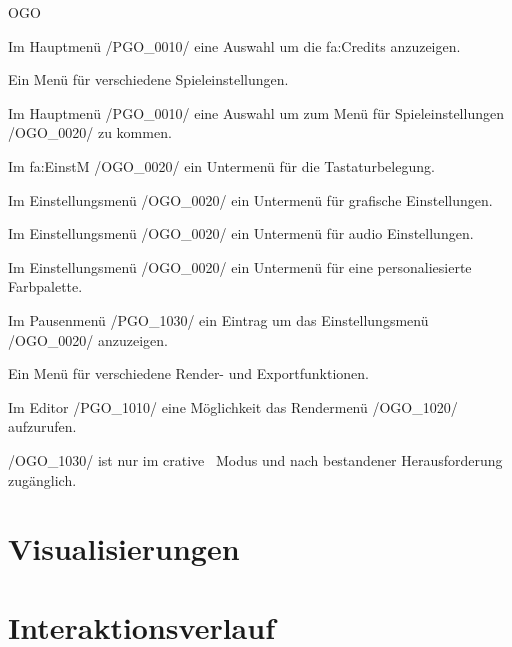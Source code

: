 \begin{ids}{\gls{OGO}}

	\id[0010] Im Hauptmenü /PGO\_0010/ eine Auswahl um die \gls{fa:Credits} anzuzeigen.
	
	\id[0020] Ein Menü für verschiedene Spieleinstellungen.
	
	\id[0030] Im Hauptmenü /PGO\_0010/ eine Auswahl um zum Menü für Spieleinstellungen /OGO\_0020/ zu kommen.
	
	\id[0040] Im \gls{fa:EinstM} /OGO\_0020/ ein Untermenü für die Tastaturbelegung.
	
	\id[0050] Im Einstellungsmenü /OGO\_0020/ ein Untermenü für grafische Einstellungen.
	
	\id[0060] Im Einstellungsmenü /OGO\_0020/ ein Untermenü für audio Einstellungen.
	
	\id[0070] Im Einstellungsmenü /OGO\_0020/ ein Untermenü für eine personaliesierte Farbpalette.
	
	\id[1010] Im Pausenmenü /PGO\_1030/ ein Eintrag um das Einstellungsmenü /OGO\_0020/ anzuzeigen.
	
	\id[1020] Ein Menü für verschiedene Render- und Exportfunktionen.
	
	\id[1030] Im Editor /PGO\_1010/ eine Möglichkeit das Rendermenü /OGO\_1020/ aufzurufen.
	
	\id[1040] /OGO\_1030/ ist nur im \glqq crative\grqq~ Modus und nach bestandener Herausforderung zugänglich.
	
\end{ids}



%
%
%
\clearpage



%
%
%



\section*{Visualisierungen}








\section{Interaktionsverlauf}

